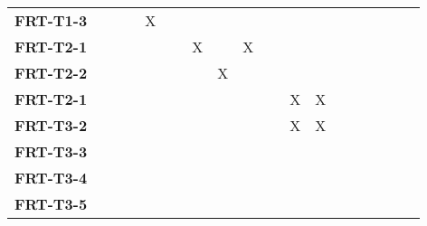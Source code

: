 \documentclass[12pt, titlepage]{article}
\begin{document}
\begin{landscape}
\begin{longtable}{|l|cccccccccccccccc|}
      	\textbf{FRT-T1-3}  & ~                                                         & ~            & X            & ~            & ~            & ~            & ~            & ~            & ~            & ~             \\
            \textbf{FRT-T2-1}  & ~                                                         & ~            & ~            & ~            & X            & ~            & X            & ~            & ~            & ~             \\
            \textbf{FRT-T2-2}  & ~                                                         & ~            & ~            & ~            & ~            & X            & ~            & ~            & ~            & ~             \\
            \textbf{FRT-T2-1}  & ~                                                         & ~            & ~            & ~            & ~            & ~            & ~            & ~            & X            & X             \\     
            \textbf{FRT-T3-2}  & ~                                                         & ~            & ~            & ~            & ~            & ~            & ~            & ~            & X            & X             \\     
            \textbf{FRT-T3-3}  & ~                                                         & ~            & ~            & ~            & ~            & ~            & ~            & ~            & ~            & ~             \\     
            \textbf{FRT-T3-4}  & ~                                                         & ~            & ~            & ~            & ~            & ~            & ~            & ~            & ~            & ~             \\     
            \textbf{FRT-T3-5}  & ~                                                         & ~            & ~            & ~            & ~            & ~            & ~            & ~            & ~            & ~             \\     
			\hline
			
		\end{longtable}
		

\end{landscape}
\end{document}
